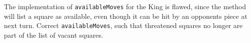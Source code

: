 The implementation of \lstinline{availableMoves} for the King is flawed, since the method will list a square as available, even though it can be hit by an opponents piece at next turn. Correct \lstinline{availableMoves}, such that threatened squares no longer are part of the list of vacant squares.
